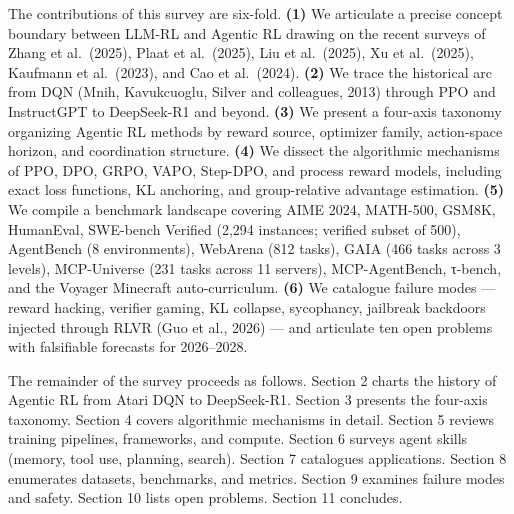 The contributions of this survey are six-fold. \textbf{(1)} We articulate a precise concept boundary between LLM-RL and Agentic RL drawing on the recent surveys of Zhang et al.~(2025), Plaat et al.~(2025), Liu et al.~(2025), Xu et al.~(2025), Kaufmann et al.~(2023), and Cao et al.~(2024). \textbf{(2)} We trace the historical arc from DQN (Mnih, Kavukcuoglu, Silver and colleagues, 2013) through PPO and InstructGPT to DeepSeek-R1 and beyond. \textbf{(3)} We present a four-axis taxonomy organizing Agentic RL methods by reward source, optimizer family, action-space horizon, and coordination structure. \textbf{(4)} We dissect the algorithmic mechanisms of PPO, DPO, GRPO, VAPO, Step-DPO, and process reward models, including exact loss functions, KL anchoring, and group-relative advantage estimation. \textbf{(5)} We compile a benchmark landscape covering AIME 2024, MATH-500, GSM8K, HumanEval, SWE-bench Verified (2,294 instances; verified subset of 500), AgentBench (8 environments), WebArena (812 tasks), GAIA (466 tasks across 3 levels), MCP-Universe (231 tasks across 11 servers), MCP-AgentBench, τ-bench, and the Voyager Minecraft auto-curriculum. \textbf{(6)} We catalogue failure modes --- reward hacking, verifier gaming, KL collapse, sycophancy, jailbreak backdoors injected through RLVR (Guo et al., 2026) --- and articulate ten open problems with falsifiable forecasts for 2026--2028.

The remainder of the survey proceeds as follows. Section 2 charts the history of Agentic RL from Atari DQN to DeepSeek-R1. Section 3 presents the four-axis taxonomy. Section 4 covers algorithmic mechanisms in detail. Section 5 reviews training pipelines, frameworks, and compute. Section 6 surveys agent skills (memory, tool use, planning, search). Section 7 catalogues applications. Section 8 enumerates datasets, benchmarks, and metrics. Section 9 examines failure modes and safety. Section 10 lists open problems. Section 11 concludes.

